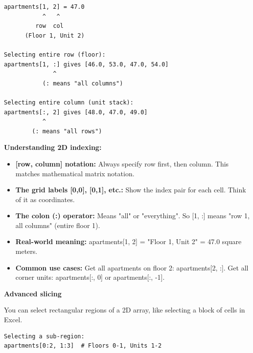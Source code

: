 \begin{tcolorbox}[
    title=Visual guide to array indexing,
    colframe=purple,
    colback = white,
    arc=2mm,
    breakable
]
\begin{lstlisting}[basicstyle=\ttfamily\footnotesize,breaklines=true,columns=fullflexible,keepspaces=true,xleftmargin=0pt]
apartments[1, 2] = 47.0
           ^   ^
         row  col
      (Floor 1, Unit 2)

Selecting entire row (floor):
apartments[1, :] gives [46.0, 53.0, 47.0, 54.0]
              ^
           (: means "all columns")

Selecting entire column (unit stack):
apartments[:, 2] gives [48.0, 47.0, 49.0]
           ^
        (: means "all rows")
\end{lstlisting}

\textbf{Understanding 2D indexing:}
\begin{itemize}
\item \textbf{[row, column] notation:} Always specify row first, then column. This matches mathematical matrix notation.
\item \textbf{The grid labels [0,0], [0,1], etc.:} Show the index pair for each cell. Think of it as coordinates.
\item \textbf{The colon (:) operator:} Means "all" or "everything". So [1, :] means "row 1, all columns" (entire floor 1).
\item \textbf{Real-world meaning:} apartments[1, 2] = "Floor 1, Unit 2" = 47.0 square meters.
\item \textbf{Common use cases:} Get all apartments on floor 2: apartments[2, :]. Get all corner units: apartments[:, 0] or apartments[:, -1].
\end{itemize}
\vspace{2em}
\textbf{Advanced slicing}

You can select rectangular regions of a 2D array, like selecting a block of cells in Excel.

\begin{lstlisting}[basicstyle=\ttfamily\footnotesize,breaklines=true,columns=fullflexible,keepspaces=true,xleftmargin=0pt]
Selecting a sub-region:
apartments[0:2, 1:3]  # Floors 0-1, Units 1-2


\end{lstlisting}
\end{tcolorbox}
